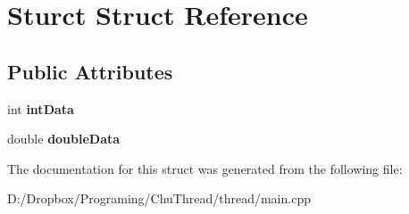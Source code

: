 \hypertarget{struct_sturct}{\section{Sturct Struct Reference}
\label{struct_sturct}
}
\subsection*{Public Attributes}
\begin{DoxyCompactItemize}
\item 
\hypertarget{struct_sturct_ac8ad5e343771985d2db1abb51f32848a}{int {\bfseries int\-Data}}\label{struct_sturct_ac8ad5e343771985d2db1abb51f32848a}

\item 
\hypertarget{struct_sturct_a50f54d847a3e8674472a3ae6433e878e}{double {\bfseries double\-Data}}\label{struct_sturct_a50f54d847a3e8674472a3ae6433e878e}

\end{DoxyCompactItemize}


The documentation for this struct was generated from the following file\-:\begin{DoxyCompactItemize}
\item 
D\-:/\-Dropbox/\-Programing/\-Chu\-Thread/thread/main.\-cpp\end{DoxyCompactItemize}

